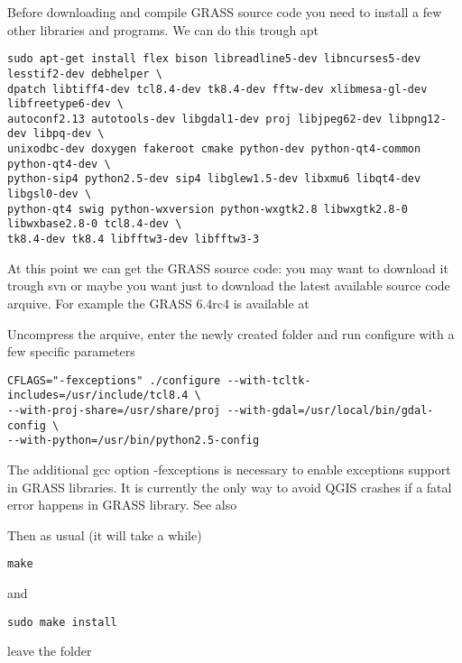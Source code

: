 Before downloading and compile GRASS source code you need to install a few
other libraries and programs. We can do this trough apt

\begin{verbatim}
sudo apt-get install flex bison libreadline5-dev libncurses5-dev lesstif2-dev debhelper \
dpatch libtiff4-dev tcl8.4-dev tk8.4-dev fftw-dev xlibmesa-gl-dev libfreetype6-dev \
autoconf2.13 autotools-dev libgdal1-dev proj libjpeg62-dev libpng12-dev libpq-dev \
unixodbc-dev doxygen fakeroot cmake python-dev python-qt4-common python-qt4-dev \
python-sip4 python2.5-dev sip4 libglew1.5-dev libxmu6 libqt4-dev libgsl0-dev \
python-qt4 swig python-wxversion python-wxgtk2.8 libwxgtk2.8-0 libwxbase2.8-0 tcl8.4-dev \
tk8.4-dev tk8.4 libfftw3-dev libfftw3-3
\end{verbatim}

At this point we can get the GRASS source code: you may want to download it
trough svn or maybe you want just to download the latest available source code arquive.
For example the GRASS 6.4rc4 is available at 

Uncompress the arquive, enter the newly created folder and run configure with a few specific parameters

\begin{verbatim}
CFLAGS="-fexceptions" ./configure --with-tcltk-includes=/usr/include/tcl8.4 \
--with-proj-share=/usr/share/proj --with-gdal=/usr/local/bin/gdal-config \
--with-python=/usr/bin/python2.5-config
\end{verbatim}

The additional gcc option -fexceptions is necessary to enable exceptions support in GRASS libraries. It is currently the only way to avoid QGIS crashes if a fatal error happens in GRASS library. See also 

Then as usual (it will take a while)

\begin{verbatim}
make
\end{verbatim}

and

\begin{verbatim}
sudo make install
\end{verbatim}

leave the folder 

